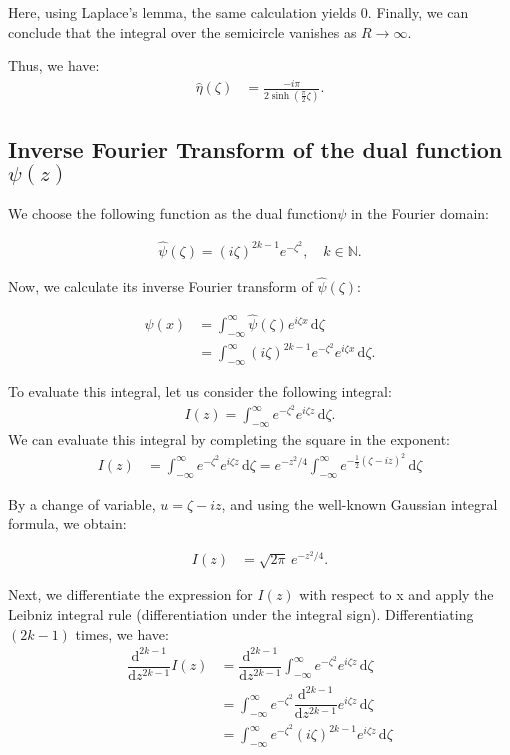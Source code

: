 \documentclass[a4paper,12pt]{article}
\newcommand{\z}{\zeta}
\newcommand{\dd}{\mathrm{d}}
\newcommand{\diff}[2]{\dfrac{\dd #1}{\dd #2}}
\newcommand{\psihat}{\widehat{\psi}}
\newcommand{\etahat}{\widehat{\eta}}
\begin{document}
Here, using Laplace's lemma, the same calculation yields 0.
Finally, we can conclude that the integral over the semicircle vanishes as $R \to \infty$.

\bigskip

Thus, we have:
\begin{align*}
  \etahat(\z) &= \frac{-i\pi}{2\sinh\left(\frac{\pi}{2} \z\right)}.
\end{align*}

\subsection{Inverse Fourier Transform of the dual function $\psi(z)$}

We choose the following function as the dual function$\psi$ in the Fourier domain:

\begin{align}
  \psihat(\z) = (i \z)^{2k-1} e^{-\z^2}, \quad k \in \mathbb{N}.
\end{align}

Now, we calculate its inverse Fourier transform of $\psihat(\z)$:

\begin{align*}
  \psi(x) &= \int_{-\infty}^{\infty} \psihat(\z) e^{i \z x} \, \dd\z \\
  &= \int_{-\infty}^{\infty} (i\z)^{2k-1} e^{-\z^2} e^{i \z x} \, \dd\z.
\end{align*}

To evaluate this integral, let us consider the following integral:
\begin{align}
  I(z) = \int_{-\infty}^{\infty} e^{-\z^2} e^{i \z z} \, \dd\z.
\end{align}
We can evaluate this integral by completing the square in the exponent:
  \begin{align*}
    I(z) &= \int_{-\infty}^{\infty} e^{-\z^2} e^{i \z z} \, \dd\z 
    = e^{-z^2/4} \int_{-\infty}^{\infty} e^{-\frac{1}{2}(\z - iz)^2} \, \dd\z
  \end{align*}

  By a change of variable, $u = \z - iz$, and using the well-known Gaussian integral formula, we obtain:

  \begin{align*}
    I(z) &= \sqrt{2\pi} \, e^{-z^2/4}.
  \end{align*}

Next, we differentiate the expression for $I(z)$ with respect to x and apply the Leibniz integral rule (differentiation under the integral sign). Differentiating $(2k-1)$ times, we have:
  \begin{align*}
    \diff{^{2k-1}}{z^{2k-1}} I(z) &= \diff{^{2k-1}}{z^{2k-1}} \int_{-\infty}^{\infty} e^{-\z^2} e^{i \z z} \, \dd\z \\
    &= \int_{-\infty}^{\infty} e^{-\z^2} \diff{^{2k-1}}{z^{2k-1}} e^{i \z z} \, \dd\z \\
    &= \int_{-\infty}^{\infty} e^{-\z^2} (i \z)^{2k-1} e^{i \z z} \, \dd\z \\
  \end{align*}
\end{document}
